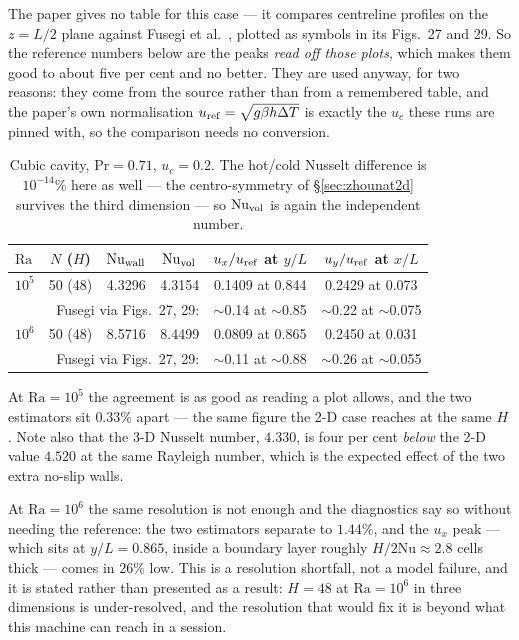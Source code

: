 \documentclass[11pt,a4paper]{article}
\begin{document}
The paper gives no table for this case --- it compares centreline profiles on the
$z=L/2$ plane against Fusegi et al.~\cite{fusegi1991}, plotted as symbols in its
Figs.~27 and 29. So the reference numbers below are the peaks \emph{read off
those plots}, which makes them good to about five per cent and no better. They
are used anyway, for two reasons: they come from the source rather than from a
remembered table, and the paper's own normalisation
$u_{\rm ref}=\sqrt{g\beta h\Delta T}$ is exactly the $u_c$ these runs are pinned
with, so the comparison needs no conversion.

\begin{table}[h]
\centering\small
\begin{tabular}{lccccc}
\toprule
$\mathrm{Ra}$ & $N$ ($H$) & $\mathrm{Nu}_{\rm wall}$ & $\mathrm{Nu}_{\rm vol}$ &
$u_x/u_{\rm ref}$ at $y/L$ & $u_y/u_{\rm ref}$ at $x/L$ \\
\midrule
$10^5$ & 50 (48) & 4.3296 & 4.3154 & 0.1409 at 0.844 & 0.2429 at 0.073 \\
       & \multicolumn{3}{r}{Fusegi via Figs.~27, 29:} & $\sim$0.14 at $\sim$0.85
       & $\sim$0.22 at $\sim$0.075 \\
$10^6$ & 50 (48) & 8.5716 & 8.4499 & 0.0809 at 0.865 & 0.2450 at 0.031 \\
       & \multicolumn{3}{r}{Fusegi via Figs.~27, 29:} & $\sim$0.11 at $\sim$0.88
       & $\sim$0.26 at $\sim$0.055 \\
\bottomrule
\end{tabular}
\caption{Cubic cavity, $\mathrm{Pr}=0.71$, $u_c=0.2$. The hot/cold Nusselt
difference is $10^{-14}\%$ here as well --- the centro-symmetry of
\S\ref{sec:zhounat2d} survives the third dimension --- so
$\mathrm{Nu}_{\rm vol}$ is again the independent
number.\label{tab:zhounat3d}}
\end{table}

\noindent At $\mathrm{Ra}=10^5$ the agreement is as good as reading a plot
allows, and the two estimators sit $0.33\%$ apart --- the same figure the 2-D
case reaches at the same $H$. Note also that the 3-D Nusselt number, $4.330$, is
four per cent \emph{below} the 2-D value $4.520$ at the same Rayleigh number,
which is the expected effect of the two extra no-slip walls.

At $\mathrm{Ra}=10^6$ the same resolution is not enough and the diagnostics say
so without needing the reference: the two estimators separate to $1.44\%$, and
the $u_x$ peak --- which sits at $y/L=0.865$, inside a boundary layer roughly
$H/2\mathrm{Nu} \approx 2.8$ cells thick --- comes in $26\%$ low. This is a
resolution shortfall, not a model failure, and it is stated rather than
presented as a result: $H=48$ at $\mathrm{Ra}=10^6$ in three dimensions is
under-resolved, and the resolution that would fix it is beyond what this machine
can reach in a session.
\end{document}
